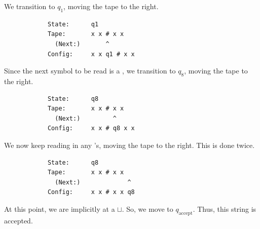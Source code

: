 \documentclass[letterpaper]{article}
\begin{document}
\begin{enumerate}
\begin{mdframed}[]
        We transition to $q_1$, moving the tape to the right. 
        \begin{verbatim}
            State:      q1
            Tape:       x x # x x
              (Next:)       ^
            Config:     x x q1 # x x
        \end{verbatim}

        Since the next symbol to be read is a \code{\#}, we transition to $q_8$, moving the tape to the right. 
        \begin{verbatim}
            State:      q8
            Tape:       x x # x x
              (Next:)         ^
            Config:     x x # q8 x x
        \end{verbatim}

        We now keep reading in any 's, moving the tape to the right. This is done twice.
        \begin{verbatim}
            State:      q8
            Tape:       x x # x x
              (Next:)             ^
            Config:     x x # x x q8
        \end{verbatim}

        At this point, we are implicitly at a $\sqcup$. So, we move to $q_{\text{accept}}$. Thus, this string is accepted.
    \end{mdframed}
\end{enumerate}
\end{document}
